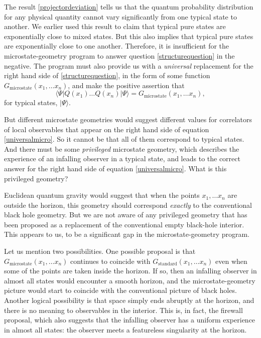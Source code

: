 \documentclass[12pt]{article}
\def\qop{Q}
\newcommand{\be}{\begin{equation}}
\newcommand{\ee}{\end{equation}}
\begin{document}
The result \eqref{projectordeviation} tells us that the quantum probability distribution for any physical quantity cannot vary significantly from one typical state to another.  We earlier used this result to claim that typical pure states are exponentially close to mixed states. But this also implies that typical pure states are exponentially close to one another. Therefore, it is insufficient for the microstate-geometry program to answer question \eqref{structurequestion} in the negative. The program must also provide us with a {\em universal} replacement for the right hand side of \eqref{structurequestion}, in the form of some function $G_{\text{microstate}}(x_1, \ldots x_n)$, and make the positive assertion that
\be
\label{universalmicro}
\langle \Psi |  \qop(x_1) \ldots \qop(x_n) |\Psi \rangle = G_{\text{microstate}}(x_1, \ldots x_n),
\ee
for typical states, $|\Psi \rangle$.


But different microstate geometries would suggest different values for correlators of local observables that appear on the right hand side of equation \eqref{universalmicro}. So it cannot be that all of them correspond to typical states. And there must be some {\em privileged} microstate geometry, which describes the experience of an infalling observer in a typical state, and leads to the correct answer for the right hand side of equation \eqref{universalmicro}. What is this privileged geometry?


Euclidean quantum gravity would suggest that when the points $x_1, \ldots x_n$ are outside the horizon, this geometry should correspond {\em exactly} to the conventional black hole geometry. But we are not aware of any privileged geometry that has been proposed as a replacement of the conventional empty black-hole interior. This appears to us, to be a significant gap in the microstate-geometry program.

Let us mention two possibilities. One possible proposal is that $G_{\text{microstate}}(x_1, \ldots x_n)$ continues to coincide with $G_{\text{standard}}(x_1, \ldots x_n)$ even when some of the points are taken inside the horizon. If so, then an infalling observer in almost all states would encounter a smooth horizon, and the microstate-geometry picture would start to coincide with the conventional picture of black holes.  Another logical possibility is that  space simply ends abruptly  at the horizon, and there is no meaning to observables in the interior. This is, in fact, the firewall proposal, which also suggests that the infalling observer has a uniform experience in almost all states: the observer meets a featureless singularity at the horizon.
\end{document}
